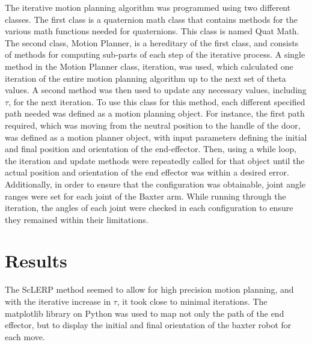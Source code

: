 \documentclass[11pt]{article}
\begin{document}
The iterative motion planning algorithm was programmed using two different classes. The first class is a quaternion math class that contains methods for the various math functions needed for quaternions. This class is named Quat Math. The second class, Motion Planner, is a hereditary of the first class, and consists of methods for computing sub-parts of each step of the iterative process. A single method in the Motion Planner class, iteration, was used, which calculated one iteration of the entire motion planning algorithm up to the next set of theta values. A second method was then used to update any necessary values, including $\tau$, for the next iteration. To use this class for this method, each different specified path needed was defined as a motion planning object. For instance, the first path required, which was moving from the neutral position to the handle of the door, was defined as a motion planner object, with input parameters defining the initial and final position and orientation of the end-effector. Then, using a while loop, the iteration and update methods were repeatedly called for that object until the actual position and orientation of the end effector was within a desired error. Additionally, in order to ensure that the configuration was obtainable, joint angle ranges were set for each joint of the Baxter arm. While running through the iteration, the angles of each joint were checked in each configuration to ensure they remained within their limitations.      

\section{Results}
The ScLERP method seemed to allow for high precision motion planning, and with the iterative increase in $\tau$, it took close to minimal iterations. The matplotlib library on Python was used to map not only the path of the end effector, but to display the initial and final orientation of the baxter robot for each move.
\end{document}
